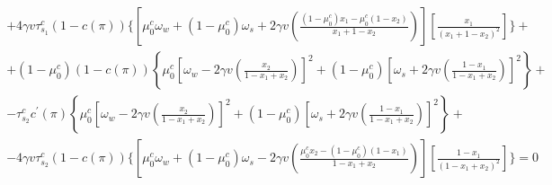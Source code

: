 \documentclass[12pt,a4paper]{article}
\begin{document}
\begin{small}
\begin{eqnarray}
\begin{split}
        +4\gamma v\tau_{s_1}^c(1-c(\pi))\Bigg\{\left[\mu_0^c\omega_w+(1-\mu_0^c)\omega_s+2\gamma v\left(\frac{(1-\mu_0^c)x_1-\mu_0^c(1-x_2)}{x_1+1-x_2}\right)\right]\left[\frac{x_1}{(x_1+1-x_2)^2}\right]\Bigg\}+\\
        +(1-\mu_0^c)(1-c(\pi))\left\{\mu_0^c\left[\omega_w-2\gamma v\left(\frac{x_2}{1-x_1+x_2}\right)\right]^2+(1-\mu_0^c)\left[\omega_s+2\gamma v\left(\frac{1-x_1}{1-x_1+x_2}\right)\right]^2\right\}+\\
        -\tau_{s_2}^cc^\prime(\pi)\left\{\mu_0^c\left[\omega_w-2\gamma v\left(\frac{x_2}{1-x_1+x_2}\right)\right]^2+(1-\mu_0^c)\left[\omega_s+2\gamma v\left(\frac{1-x_1}{1-x_1+x_2}\right)\right]^2\right\}+\\
        -4\gamma v\tau_{s_2}^c(1-c(\pi))\Bigg\{\left[\mu_0^c\omega_w+(1-\mu_0^c)\omega_s-2\gamma v\left(\frac{\mu_0^cx_2-(1-\mu_0^c)(1-x_1)}{1-x_1+x_2}\right)\right]\left[\frac{1-x_1}{(1-x_1+x_2)^2}\right]\Bigg\}=0
    \end{split}
\end{eqnarray}
\end{small}
\end{document}
